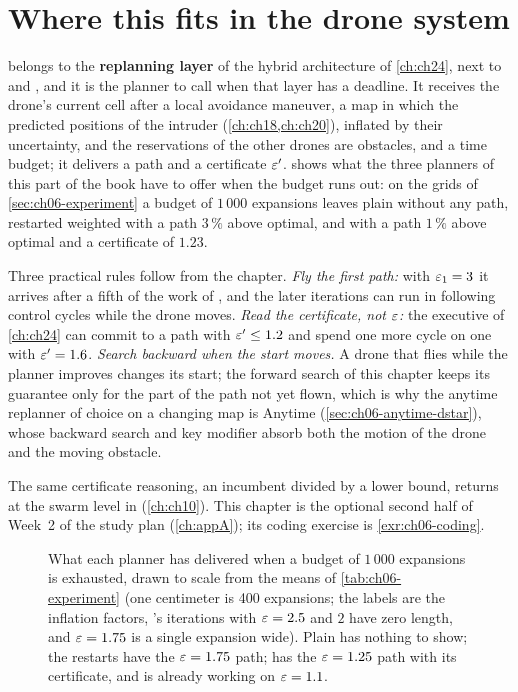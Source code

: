 \section{Where this fits in the drone system}
\label{sec:ch06-drone}

\begin{dronebox}
\arastar belongs to the \textbf{replanning layer} of the hybrid architecture
of \cref{ch:ch24}, next to \dstarlite and \astar, and it is the planner to
call when that layer has a deadline. It receives the drone's current cell
after a local avoidance maneuver, a map in which the predicted positions of
the intruder (\cref{ch:ch18,ch:ch20}), inflated by their uncertainty, and the
reservations of the other drones are obstacles, and a time budget; it delivers
a path and a certificate $\varepsilon'$.  shows what the
three planners of this part of the book have to offer when the budget runs
out: on the grids of \cref{sec:ch06-experiment} a budget of $1\,000$
expansions leaves plain \astar without any path, restarted weighted \astar
with a path $3\,\%$ above optimal, and \arastar with a path $1\,\%$ above
optimal and a certificate of $1.23$.

Three practical rules follow from the chapter. \emph{Fly the first path:}
with $\varepsilon_1 = 3$ it arrives after a fifth of the work of \astar, and the
later iterations can run in following control cycles while the drone moves.
\emph{Read the certificate, not $\varepsilon$:} the executive of \cref{ch:ch24} can
commit to a path with $\varepsilon' \le 1.2$ and spend one more cycle on one with
$\varepsilon' = 1.6$. \emph{Search backward when the start moves.} A drone that flies while the
planner improves changes its start; the forward search of this chapter keeps
its guarantee only for the part of the path not yet flown, which is why the
anytime replanner of choice on a changing map is Anytime \dstar
(\cref{sec:ch06-anytime-dstar}), whose backward search and key modifier
absorb both the motion of the drone and the moving obstacle.

The same certificate reasoning, an incumbent divided by a lower bound,
returns at the swarm level in \ecbs (\cref{ch:ch10}). This chapter is the
optional second half of Week~2 of the study plan (\cref{ch:appA}); its coding
exercise is \cref{exr:ch06-coding}.
\end{dronebox}

\begin{figure}[tb]
  \centering
  \caption{What each planner has delivered when a budget of $1\,000$
  expansions is exhausted, drawn to scale from the means of
  \cref{tab:ch06-experiment} (one centimeter is 400 expansions; the labels
  are the inflation factors, \arastar's iterations with $\varepsilon = 2.5$ and
  $2$ have zero length, and $\varepsilon = 1.75$ is a single expansion wide). Plain \astar has nothing to show; the restarts have
  the $\varepsilon = 1.75$ path; \arastar has the $\varepsilon = 1.25$ path with its
  certificate, and is already working on $\varepsilon = 1.1$.}
  \label{fig:ch06-deadline}
\end{figure}

